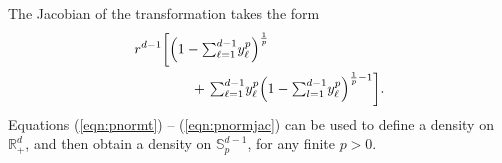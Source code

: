   The Jacobian of the transformation takes the form
  \begin{equation}
    \label{eqn:pnormjac}
    \begin{aligned}
    r^{d-1}\left[\left(1 - {\textstyle\sum}_{\ell = 1}^{d-1}y_{\ell}^p\right)^{\frac{1}{p}} \right. & \\
        &\hspace{-2cm}+ \left. {\textstyle\sum}_{\ell = 1}^{d-1}y_{\ell}^p\left(1 - {\textstyle\sum}_{l=1}^{d-1} y_{\ell}^p\right)^{\frac{1}{p} - 1}\right].
    \end{aligned}
  \end{equation}
  Equations (\ref{eqn:pnormt}) -- (\ref{eqn:pnormjac}) can be used to define a density on ${\mathbb R}^d_+$, and then obtain a density on ${\mathbb S}_{p}^{d-1}$, for any finite $p>0$.
  
